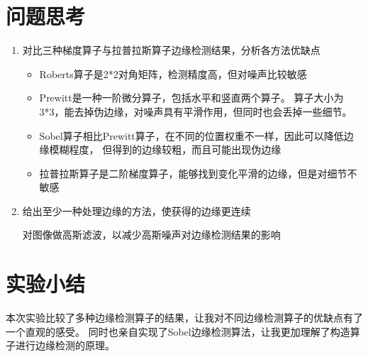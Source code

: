 \documentclass[a4paper]{ctexart}
\begin{document}
  \newpage
  \section{问题思考}
  \begin{enumerate}
    \item 对比三种梯度算子与拉普拉斯算子边缘检测结果，分析各方法优缺点

    \begin{itemize}
      \item Roberts算子是2*2对角矩阵，检测精度高，但对噪声比较敏感
      \item Prewitt是一种一阶微分算子，包括水平和竖直两个算子。
      算子大小为3*3，能去掉伪边缘，对噪声具有平滑作用，但同时也会丢掉一些细节。
      \item Sobel算子相比Prewitt算子，在不同的位置权重不一样，因此可以降低边缘模糊程度，
      但得到的边缘较粗，而且可能出现伪边缘
      \item 拉普拉斯算子是二阶梯度算子，能够找到变化平滑的边缘，但是对细节不敏感
    \end{itemize}

    \item 给出至少一种处理边缘的方法，使获得的边缘更连续

    对图像做高斯滤波，以减少高斯噪声对边缘检测结果的影响
  \end{enumerate}

  \section{实验小结}
  本次实验比较了多种边缘检测算子的结果，让我对不同边缘检测算子的优缺点有了一个直观的感受。
  同时也亲自实现了Sobel边缘检测算法，让我更加理解了构造算子进行边缘检测的原理。
\end{document}
